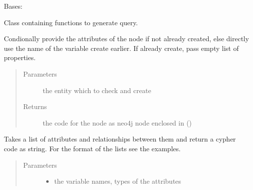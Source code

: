 \documentclass[letterpaper,10pt,english]{sphinxmanual}
\begin{document}
\begin{fulllineitems}
\label{\detokenize{neo4j_query_generation:generate_queries.CreateQuery}}
Bases: 

Class containing functions to generate query.

\begin{fulllineitems}
\label{\detokenize{neo4j_query_generation:generate_queries.CreateQuery.conditional_create}}
Condionally provide the attributes of the node if not already created, else directly use the name of the variable create earlier.
If already create, pass empty list of properties.
\begin{quote}\begin{description}
\item[{Parameters}] \leavevmode
{} \textendash{} the entity which to check and create

\item[{Returns}] \leavevmode
the code for the node as neo4j node enclosed in ()

\end{description}\end{quote}

\end{fulllineitems}


\begin{fulllineitems}
\label{\detokenize{neo4j_query_generation:generate_queries.CreateQuery.create_query}}
Takes a list of attributes and relationships between them and return a cypher code as string.
For the format of the lists see the examples.
\begin{quote}\begin{description}
\item[{Parameters}] \leavevmode\begin{itemize}
\item {} 
 \textendash{} the variable names, types of the attributes


\end{itemize}
\end{description}
\end{quote}
\end{fulllineitems}
\end{fulllineitems}
\end{document}
